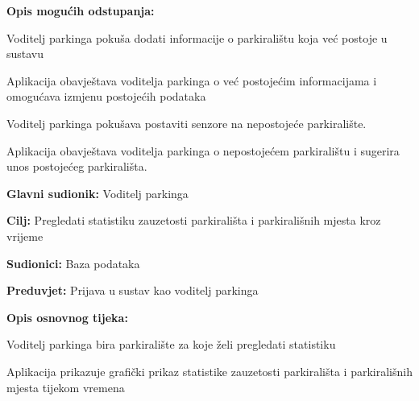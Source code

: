 {\begin{packed_item}
\begin{packed_enum}
	\end{packed_enum}
	
	\item  \textbf{Opis mogućih odstupanja:}
	
	\item[] \begin{packed_item}
		
		\item[1.a] Voditelj parkinga pokuša dodati informacije o parkiralištu koja već postoje u sustavu
		\item[] \begin{packed_enum}
			
			\item Aplikacija obavještava voditelja parkinga o već postojećim informacijama i omogućava izmjenu postojećih podataka
			
		\end{packed_enum}
		\item[3.a] Voditelj parkinga pokušava postaviti senzore na nepostojeće parkiralište.
		\item[] \begin{packed_enum}
			
			\item Aplikacija obavještava voditelja parkinga o nepostojećem parkiralištu i sugerira unos postojećeg parkirališta.
			
		\end{packed_enum}
		
	\end{packed_item}
	
\end{packed_item}

\noindent {}
\begin{packed_item}
	
	\item \textbf{Glavni sudionik: }Voditelj parkinga
	\item  \textbf{Cilj:} Pregledati statistiku zauzetosti parkirališta i parkirališnih mjesta kroz vrijeme
	\item  \textbf{Sudionici:} Baza podataka
	\item  \textbf{Preduvjet:} Prijava u sustav kao voditelj parkinga
	\item  \textbf{Opis osnovnog tijeka:}
	
	\item[] \begin{packed_enum}
		
		\item Voditelj parkinga bira parkiralište za koje želi pregledati statistiku
		\item Aplikacija prikazuje grafički prikaz statistike zauzetosti parkirališta i parkirališnih mjesta tijekom vremena
		

\end{packed_enum}
\end{packed_item}}
